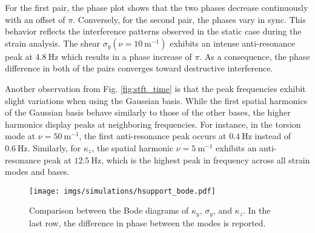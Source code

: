     For the first pair, the phase plot shows that the two phases decrease continuously with an offset of $\pi$. Conversely, for the second pair, the phases vary in sync. This behavior reflects the interference patterns observed in the static case during the strain analysis.
    The shear $\sigma_y(\nu = \SI{10}{\meter^{-1}})$ exhibits an intense anti-resonance peak at $\SI{4.8}{\hertz}$ which results in a phase increase of $\pi$.
    As a consequence, the phase difference in both of the pairs converges toward destructive interference.

    Another observation from Fig. \ref{fig:stft_time} is that the peak frequencies exhibit slight variations when using the Gaussian basis. While the first spatial harmonics of the Gaussian basis behave similarly to those of the other bases, the higher harmonics display peaks at neighboring frequencies.
    For instance, in the torsion mode at $\nu = \SI{50}{\meter^{-1}}$, the first anti-resonance peak occurs at $\SI{0.4}{\hertz}$ instead of $\SI{0.6}{\hertz}$. Similarly, for $\kappa_z$, the spatial harmonic $\nu = \SI{5}{\meter^{-1}}$ exhibits an anti-resonance peak at $\SI{12.5}{\hertz}$, which is the highest peak in frequency across all strain modes and bases.
    \begin{figure}
        \centering
        \texttt{[image: imgs/simulations/hsupport\_bode.pdf]}
        \caption{Comparison between the Bode diagrams of $\kappa_y$, $\sigma_y$, and $\kappa_z$. In the last row, the difference in phase between the modes is reported.}
        \label{fig:hsupport_bode}
    \end{figure}
    

